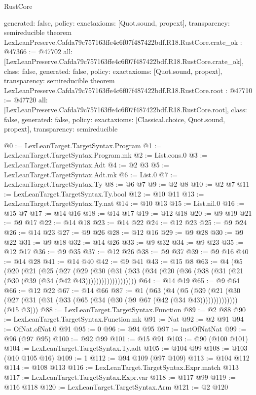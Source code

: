 \begin{lexlean}{RustCore}
\begin{coremodule}
{  generated: false,
  policy: exact{axioms: [Quot.sound, propext]},
  transparency: semireducible
}
theorem LexLeanPreserve.Cafda79c757163ffe4c6f07f487422bdf.R18.RustCore.crate_ok : @47366 := @47702 {
  all: [LexLeanPreserve.Cafda79c757163ffe4c6f07f487422bdf.R18.RustCore.crate_ok],
  class: false,
  generated: false,
  policy: exact{axioms: [Quot.sound, propext]},
  transparency: semireducible
}
theorem LexLeanPreserve.Cafda79c757163ffe4c6f07f487422bdf.R18.RustCore.root : @47710 := @47720 {
  all: [LexLeanPreserve.Cafda79c757163ffe4c6f07f487422bdf.R18.RustCore.root],
  class: false,
  generated: false,
  policy: exact{axioms: [Classical.choice, Quot.sound, propext]},
  transparency: semireducible
}

@0 := LexLeanTarget.TargetSyntax.Program
@1 := LexLeanTarget.TargetSyntax.Program.mk
@2 := List.cons.{0}
@3 := LexLeanTarget.TargetSyntax.Adt
@4 := @2 @3
@5 := LexLeanTarget.TargetSyntax.Adt.mk
@6 := List.{0}
@7 := LexLeanTarget.TargetSyntax.Ty
@8 := @6 @7
@9 := @2 @8
@10 := @2 @7
@11 := LexLeanTarget.TargetSyntax.Ty.bool
@12 := @10 @11
@13 := LexLeanTarget.TargetSyntax.Ty.nat
@14 := @10 @13
@15 := List.nil.{0}
@16 := @15 @7
@17 := @14 @16
@18 := @14 @17
@19 := @12 @18
@20 := @9 @19
@21 := @9 @17
@22 := @14 @18
@23 := @14 @22
@24 := @12 @23
@25 := @9 @24
@26 := @14 @23
@27 := @9 @26
@28 := @12 @16
@29 := @9 @28
@30 := @9 @22
@31 := @9 @18
@32 := @14 @26
@33 := @9 @32
@34 := @9 @23
@35 := @12 @17
@36 := @9 @35
@37 := @12 @26
@38 := @9 @37
@39 := @9 @16
@40 := @14 @28
@41 := @14 @40
@42 := @9 @41
@43 := @15 @8
@63 := @4
    (@5
      (@20
        (@21
          (@25
            (@27
              (@29
                (@30
                  (@31 (@33 (@34 (@20 (@36 (@38 (@31 (@21 (@30 (@39 (@34 (@42 @43)))))))))))))))))))
@64 := @14 @19
@65 := @9 @64
@66 := @12 @22
@67 := @14 @66
@87 := @1
    (@63
      (@4
        (@5 (@39 (@21 (@30 (@27 (@31 (@31 (@33 (@65 (@34 (@30 (@9 @67 (@42 (@34 @43))))))))))))))
        (@15 @3)))
@88 := LexLeanTarget.TargetSyntax.Function
@89 := @2 @88
@90 := LexLeanTarget.TargetSyntax.Function.mk
@91 := Nat
@92 := @2 @91
@94 := OfNat.ofNat.{0} @91
@95 := 0
@96 := @94 @95
@97 := instOfNatNat
@99 := @96 (@97 @95)
@100 := @92 @99
@101 := @15 @91
@103 := @90 (@100 @101)
@104 := LexLeanTarget.TargetSyntax.Ty.adt
@105 := @104 @99
@108 := @103 (@10 @105 @16)
@109 := 1
@112 := @94 @109 (@97 @109)
@113 := @104 @112
@114 := @108 @113
@116 := LexLeanTarget.TargetSyntax.Expr.match @113
@117 := LexLeanTarget.TargetSyntax.Expr.var
@118 := @117 @99
@119 := @116 @118
@120 := LexLeanTarget.TargetSyntax.Arm
@121 := @2 @120

\end{coremodule}
\end{lexlean}
